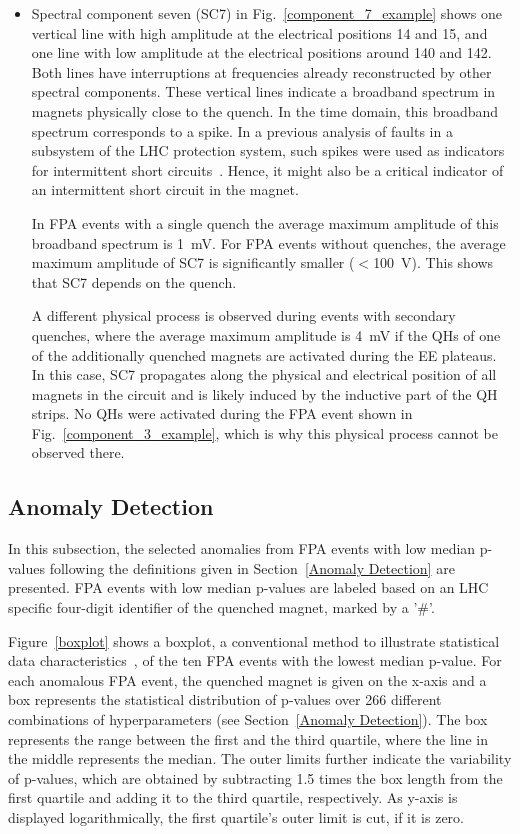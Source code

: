 \documentclass[lettersize,journal]{IEEEtran}
\begin{document}
\begin{itemize}
    \item Spectral component seven (SC7) in Fig.~\ref{component_7_example} shows one vertical line with high amplitude at the electrical positions 14 and 15, and one line with low amplitude at the electrical positions around 140 and 142. 
    Both lines have interruptions at frequencies already reconstructed by other spectral components.
    These vertical lines indicate a broadband spectrum in magnets physically close to the quench. 
    In the time domain, this broadband spectrum corresponds to a spike.
    In a previous analysis of faults in a subsystem of the LHC protection system, such spikes were used as indicators for intermittent short circuits~\cite{charifoulline2016overview}. 
    Hence, it might also be a critical indicator of an intermittent short circuit in the magnet.
    
    In FPA events with a single quench the average maximum amplitude of this broadband spectrum is 1~mV.
    For FPA events without quenches, the average maximum amplitude of SC7 is significantly smaller ($<$100~\textmu V). 
    This shows that SC7 depends on the quench.
    
    A different physical process is observed during events with secondary quenches, where the average maximum amplitude is 4~mV if the QHs of one of the additionally quenched magnets are activated during the EE plateaus. In this case, SC7 propagates along the physical and electrical position of all magnets in the circuit and is likely induced by the inductive part of the QH strips. 
    No QHs were activated during the FPA event shown in Fig.~\ref{component_3_example}, which is why this physical process cannot be observed there.
\end{itemize}

\subsection{Anomaly Detection}
In this subsection, the selected anomalies from FPA events with low median p-values following the definitions given in Section~\ref{Anomaly Detection} are presented. 
FPA events with low median p-values are labeled based on an LHC specific four-digit identifier of the quenched magnet, marked by a '\#'.


Figure~\ref{boxplot} shows a boxplot, a conventional method to illustrate statistical data characteristics~\cite{Tukey1977}, of the ten FPA events with the lowest median p-value.
For each anomalous FPA event, the quenched magnet is given on the x-axis and a box represents the statistical distribution of p-values over 266 different combinations of hyperparameters (see Section~\ref{Anomaly Detection}).
The box represents the range between the first and the third quartile, where the line in the middle represents the median.
The outer limits further indicate the variability of p-values, which are obtained by subtracting 1.5 times the box length from the first quartile and adding it to the third quartile, respectively. As y-axis is displayed logarithmically, the first quartile's outer limit is cut, if it is zero.
\end{document}
